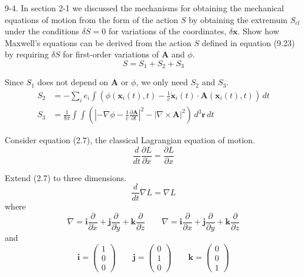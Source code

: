 \documentclass[12pt]{article}
\begin{document}
9-4.
In section 2-1 we discussed the mechanisms for obtaining
the mechanical equations of motion from the form of the action $S$ by
obtaining the extremum $S_{cl}$ under the conditions $\delta S=0$
for variations
of the coordinates, $\delta\mathbf x$. Show how Maxwell's equations can be
derived
from the action $S$ defined in equation (9.23) by requiring $\delta S$
for first-order variations of $\mathbf A$ and $\phi$.
\begin{equation*}
S=S_1+S_2+S_3
\tag{9.23}
\end{equation*}

Since $S_1$ does not depend on $\mathbf A$ or $\phi$,
we only need $S_2$ and $S_3$.
\begin{align*}
S_2&=-\sum_i e_i\int\left(
\phi(\mathbf x_i(t),t)
-\frac{1}{c}\dot{\mathbf x}_i(t)\cdot\mathbf A(\mathbf x_i(t),t)
\right)
\,dt
\tag{9.25}
\\
S_3&=\frac{1}{8\pi}\int\int
\left(
\left|-\nabla\phi-\frac{1}{c}\frac{\partial\mathbf A}{\partial t}\right|^2
-\left|\nabla\times\mathbf A\right|^2
\right)
\,d^3\mathbf r\,dt
\tag{9.26}
\end{align*}

Consider equation (2.7), the classical Lagrangian equation of motion.
\begin{equation*}
\frac{d}{dt}\frac{\partial L}{\partial\dot x}=\frac{\partial L}{\partial x}
\tag{2.7}
\end{equation*}

Extend (2.7) to three dimensions.
\begin{equation*}
\frac{d}{dt}\dot\nabla L=\nabla L
\tag{1}
\end{equation*}
where
\begin{equation*}
\dot\nabla
=\mathbf i\frac{\partial}{\partial\dot x}
+\mathbf j\frac{\partial}{\partial\dot y}
+\mathbf k\frac{\partial}{\partial\dot z}
\qquad
\nabla
=\mathbf i\frac{\partial}{\partial x}
+\mathbf j\frac{\partial}{\partial y}
+\mathbf k\frac{\partial}{\partial z}
\end{equation*}
and
\begin{equation*}
\mathbf i=\begin{pmatrix}1\\0\\0\end{pmatrix}
\qquad
\mathbf j=\begin{pmatrix}0\\1\\0\end{pmatrix}
\qquad
\mathbf k=\begin{pmatrix}0\\0\\1\end{pmatrix}
\end{equation*}
\end{document}
